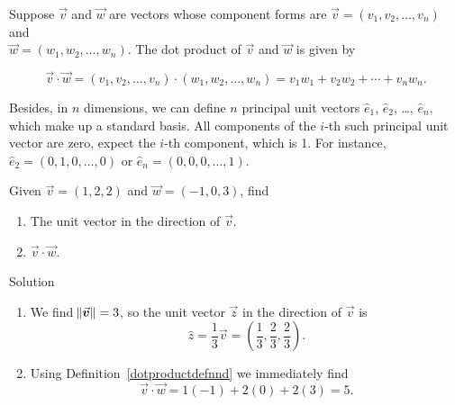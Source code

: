 \begin{definition} \label{dotproductdefnnd}    
Suppose $\vec{v}$ and $\vec{w}$ are vectors whose component forms are $\vec{v} = \left(v_1,v_2,\ldots, v_n\right)$ and\\  $\vec{w} = \left(w_1,w_2,\ldots,w_n\right)$.  The dot product   of $\vec{v}$ and $\vec{w}$ is given by

\[ \vec{v} \cdot \vec{w} = \left(v_1,v_2,\ldots,v_n\right) \cdot \left(w_1,w_2,\ldots,w_n\right) = v_1w_1 + v_2w_2 +\cdots+ v_nw_n. \]

\end{definition}


Besides, in $n$ dimensions, we can define $n$ principal unit vectors $\hat{e}_1$, $\hat{e}_2$, \ldots, $\hat{e}_n$, which make up a standard basis. All components of the $i$-th such principal unit vector are zero, expect the $i$-th component, which is 1. For instance, $\hat{e}_2 = \left(0,1,0,\ldots,0\right)$ or $\hat{e}_n = \left(0,0,0,\ldots,1\right)$.


 


\fi 

\begin{example}
Given $\vec{v} = \left(1,2,2\right)$ and $\vec{w} = \left(-1,0,3\right)$, find
\begin{enumerate}
\item The unit vector in the direction of $\vec{v}$.
\item $\vec{v}\cdot\vec{w}$.
\end{enumerate}

Solution 

\begin{enumerate}
	\item		We find $\norm{\vec v} = 3$, so the unit vector $\vec z$ in the direction of $\vec v$ is
	$$\hat{z} = \frac13\vec v = \left( \frac13,\frac23,\frac23\right).$$
	\item Using Definition~\ref{dotproductdefnnd} we immediately find
	$$
	\vec{v}\cdot\vec{w}=1(-1)+2(0)+2(3)=5.
	$$
	\end{enumerate}
\end{example}


